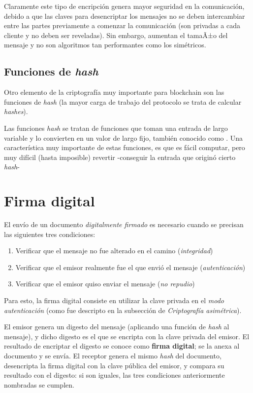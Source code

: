 Claramente este tipo de encripción genera mayor seguridad en la comunicación, debido a que las claves para desencriptar los mensajes no se deben intercambiar entre las partes previamente a comenzar la comunicación (son privadas a cada cliente y no deben ser reveladas). Sin embargo, aumentan el tamaÃ±o del mensaje y no son algoritmos tan performantes como los simétricos.

\subsection{Funciones de \emph{hash}}

Otro elemento de la criptografía muy importante para blockchain son las funciones de \emph{hash} (la mayor carga de trabajo del protocolo se trata de calcular \emph{hashes}).

Las funciones \emph{hash} se tratan de funciones que toman una entrada de largo variable y lo convierten en un valor de largo fijo, también conocido como  \autocite{VanhouvtenHashIntro}. Una característica muy importante de estas funciones, es que es fácil computar, pero muy difícil (hasta imposible) revertir -conseguir la entrada que originó cierto \emph{hash}-

\section{Firma digital}

El envío de un documento \emph{digitalmente firmado} es necesario cuando se precisan las siguientes tres condiciones:

\begin{enumerate}
    \item Verificar que el mensaje no fue alterado en el camino (\emph{integridad})
    \item Verificar que el emisor realmente fue el que envió el mensaje (\emph{autenticación})
    \item Verificar que el emisor quiso enviar el mensaje (\emph{no repudio})
\end{enumerate}

Para esto, la firma digital consiste en utilizar la clave privada en el \emph{modo autenticación} (como fue descripto en la subsección de \emph{Criptografía asimétrica}). 

El emisor genera un digesto del mensaje (aplicando una función de \emph{hash} al mensaje), y dicho digesto es el que se encripta con la clave privada del emisor. El resultado de encriptar el digesto se conoce como \textbf{firma digital}; se la anexa al documento y se envía. El receptor genera el mismo \emph{hash} del documento, desencripta la firma digital con la clave pública del emisor, y compara su resultado con el digesto: si son iguales, las tres condiciones anteriormente nombradas se cumplen.  

